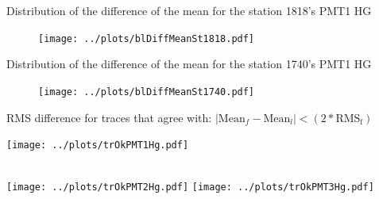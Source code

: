 \documentclass[aspectratio=169]{beamer}
\begin{document}
\begin{frame}
  Distribution of the difference of the mean for the station 1818's PMT1 HG
  \begin{figure}[h]
    \centering
    \texttt{[image: ../plots/blDiffMeanSt1818.pdf]}
    \end{figure}
\end{frame}

\begin{frame}
  Distribution of the difference of the mean for the station 1740's PMT1 HG
  \begin{figure}[h]
    \centering
    \texttt{[image: ../plots/blDiffMeanSt1740.pdf]}
    \end{figure}
\end{frame}

%
%
%


\begin{frame}
	RMS difference for traces that agree with: $\mid \mathrm{Mean}_f - \mathrm{Mean}_l \mid < \left( 2*\mathrm{RMS_f} \right) $

  \centering
	\texttt{[image: ../plots/trOkPMT1Hg.pdf]}\quad%
	\begin{minipage}[b][0.4\textheight][c]
		{.45\linewidth}
	\end{minipage}\\[1em]
	\texttt{[image: ../plots/trOkPMT2Hg.pdf]}\quad%
	\texttt{[image: ../plots/trOkPMT3Hg.pdf]}
\end{frame}


%
%
\end{document}
